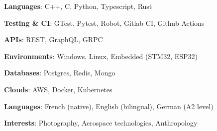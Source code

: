 \documentclass[9pt]{developercv2} %
\begin{document}
\begin{minipage}[t]{0.5\textwidth}
	\textbf{Languages}: C++, C, Python, Typescript, Rust
	
	\textbf{Testing \& CI}: GTest, Pytest, Robot, Gitlab CI, Github Actions

	\textbf{APIs}: REST, GraphQL, GRPC
\end{minipage}
\begin{minipage}[t]{0.5\textwidth}
	\textbf{Environments}: Windows, Linux, Embedded (STM32, ESP32)

	\textbf{Databases}: Postgres, Redis, Mongo
	
	\textbf{Clouds}: AWS, Docker, Kubernetes
\end{minipage}

\textbf{Languages}: French (native), English (bilingual), German (A2 level)

\textbf{Interests}: Photography, Aerospace technologies, Anthropology
\end{document}
